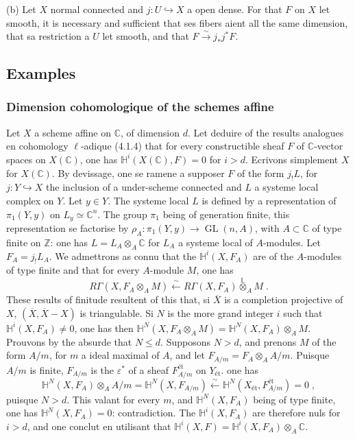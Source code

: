 \documentclass[12pt,a4paper]{article}
\theoremstyle{plain}
\theoremstyle{definition}
\theoremstyle{remark}
\DeclareMathOperator{\GL}{GL}
\newcommand{\CC}{\mathbb{C}}
\newcommand{\HH}{\mathbb{H}}
\newcommand{\ZZ}{\mathbb{Z}}
\newcommand{\LL}{\mathbb{L}}
\begin{document}
(b) Let $X$ normal connected and $j: U \hookrightarrow X$ a open dense. For that $F$ on $X$ let smooth, it is necessary and sufficient that ses fibers aient all the same dimension, that sa restriction a $U$ let smooth, and that $F \xrightarrow{\sim} j_*j^*F$.

\subsection{Examples}

\subsubsection{Dimension cohomologique of the schemes affine}

Let $X$ a scheme affine on $\CC$, of dimension $d$. Let deduire of the results analogues en cohomology $\ell$-adique (4.1.4) that for every constructible sheaf $F$ of $\CC$-vector spaces on $X(\CC)$, one has $\HH^i(X(\CC), F) = 0$ for $i > d$. Ecrivons simplement $X$ for $X(\CC)$. By devissage, one se ramene a supposer $F$ of the form $j_!L$, for $j: Y \hookrightarrow X$ the inclusion of a under-scheme connected and $L$ a systeme local complex on $Y$. Let $y \in Y$. The systeme local $L$ is defined by a representation of $\pi_1(Y, y)$ on $L_y \simeq \CC^n$. The group $\pi_1$ being of generation finite, this representation se factorise by $\rho_A: \pi_1(Y, y) \to \GL(n, A)$, with $A \subset \CC$ of type finite on $\ZZ$: one has $L = L_A \otimes_A \CC$ for $L_A$ a systeme local of $A$-modules. Let $F_A = j_!L_A$. We admettrons as connu that the $\HH^i(X, F_A)$ are of the $A$-modules of type finite and that for every $A$-module $M$, one has
\[
R\Gamma(X, F_A \otimes_A M) \xleftarrow{\sim} R\Gamma(X, F_A) \overset{\LL}{\otimes}_A M\;.
\]
These results of finitude resultent of this that, si $\overline{X}$ is a completion projective of $X$, $(\overline{X}, \overline{X} - X)$ is triangulable. Si $N$ is the more grand integer $i$ such that $\HH^i(X, F_A) \neq 0$, one has then $\HH^N(X, F_A \otimes_A M) = \HH^N(X, F_A) \otimes_A M$. Prouvons by the absurde that $N \leq d$. Supposons $N > d$, and prenons $M$ of the form $A/m$, for $m$ a ideal maximal of $A$, and let $F_{A/m} = F_A \otimes_A A/m$. Puisque $A/m$ is finite, $F_{A/m}$ is the $\varepsilon^*$ of a sheaf $F^{\text{\'et}}_{A/m}$ on $Y_{\text{\'et}}$. one has
\[
\HH^N(X, F_A) \otimes_A A/m = \HH^N(X, F_{A/m}) \xleftarrow{\sim} \HH^N(X_{\text{\'et}}, F^{\text{\'et}}_{A/m}) = 0\;,
\]
puisque $N > d$. This valant for every $m$, and $\HH^N(X, F_A)$ being of type finite, one has $\HH^N(X, F_A) = 0$: contradiction. The $\HH^i(X, F_A)$ are therefore nuls for $i > d$, and one conclut en utilisant that $\HH^i(X, F) = \HH^i(X, F_A) \otimes_A \CC$.
\end{document}
